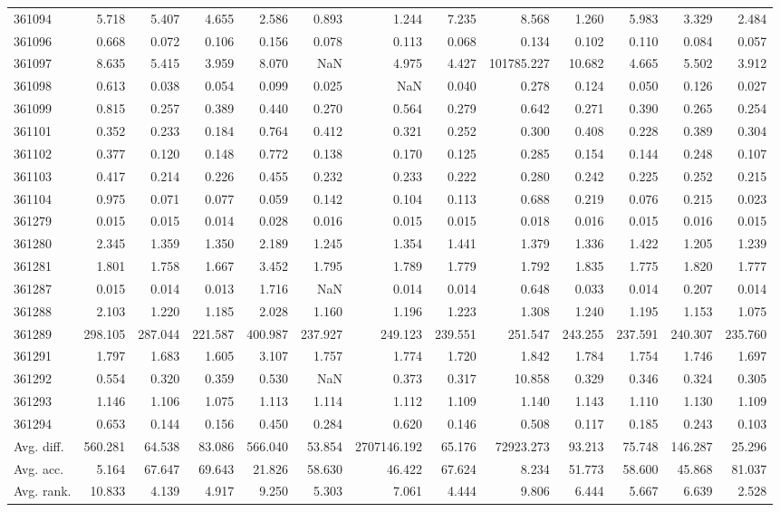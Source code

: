 \begin{tabular}{lrrrrrrrrrrrr}
361094 & 5.718 & 5.407 & 4.655 & 2.586 & 0.893 & 1.244 & 7.235 & 8.568 & 1.260 & 5.983 & 3.329 & 2.484 \\
361096 & 0.668 & 0.072 & 0.106 & 0.156 & 0.078 & 0.113 & 0.068 & 0.134 & 0.102 & 0.110 & 0.084 & 0.057 \\
361097 & 8.635 & 5.415 & 3.959 & 8.070 & NaN & 4.975 & 4.427 & 101785.227 & 10.682 & 4.665 & 5.502 & 3.912 \\
361098 & 0.613 & 0.038 & 0.054 & 0.099 & 0.025 & NaN & 0.040 & 0.278 & 0.124 & 0.050 & 0.126 & 0.027 \\
361099 & 0.815 & 0.257 & 0.389 & 0.440 & 0.270 & 0.564 & 0.279 & 0.642 & 0.271 & 0.390 & 0.265 & 0.254 \\
361101 & 0.352 & 0.233 & 0.184 & 0.764 & 0.412 & 0.321 & 0.252 & 0.300 & 0.408 & 0.228 & 0.389 & 0.304 \\
361102 & 0.377 & 0.120 & 0.148 & 0.772 & 0.138 & 0.170 & 0.125 & 0.285 & 0.154 & 0.144 & 0.248 & 0.107 \\
361103 & 0.417 & 0.214 & 0.226 & 0.455 & 0.232 & 0.233 & 0.222 & 0.280 & 0.242 & 0.225 & 0.252 & 0.215 \\
361104 & 0.975 & 0.071 & 0.077 & 0.059 & 0.142 & 0.104 & 0.113 & 0.688 & 0.219 & 0.076 & 0.215 & 0.023 \\
361279 & 0.015 & 0.015 & 0.014 & 0.028 & 0.016 & 0.015 & 0.015 & 0.018 & 0.016 & 0.015 & 0.016 & 0.015 \\
361280 & 2.345 & 1.359 & 1.350 & 2.189 & 1.245 & 1.354 & 1.441 & 1.379 & 1.336 & 1.422 & 1.205 & 1.239 \\
361281 & 1.801 & 1.758 & 1.667 & 3.452 & 1.795 & 1.789 & 1.779 & 1.792 & 1.835 & 1.775 & 1.820 & 1.777 \\
361287 & 0.015 & 0.014 & 0.013 & 1.716 & NaN & 0.014 & 0.014 & 0.648 & 0.033 & 0.014 & 0.207 & 0.014 \\
361288 & 2.103 & 1.220 & 1.185 & 2.028 & 1.160 & 1.196 & 1.223 & 1.308 & 1.240 & 1.195 & 1.153 & 1.075 \\
361289 & 298.105 & 287.044 & 221.587 & 400.987 & 237.927 & 249.123 & 239.551 & 251.547 & 243.255 & 237.591 & 240.307 & 235.760 \\
361291 & 1.797 & 1.683 & 1.605 & 3.107 & 1.757 & 1.774 & 1.720 & 1.842 & 1.784 & 1.754 & 1.746 & 1.697 \\
361292 & 0.554 & 0.320 & 0.359 & 0.530 & NaN & 0.373 & 0.317 & 10.858 & 0.329 & 0.346 & 0.324 & 0.305 \\
361293 & 1.146 & 1.106 & 1.075 & 1.113 & 1.114 & 1.112 & 1.109 & 1.140 & 1.143 & 1.110 & 1.130 & 1.109 \\
361294 & 0.653 & 0.144 & 0.156 & 0.450 & 0.284 & 0.620 & 0.146 & 0.508 & 0.117 & 0.185 & 0.243 & 0.103 \\
Avg. diff. & 560.281 & 64.538 & 83.086 & 566.040 & 53.854 & 2707146.192 & 65.176 & 72923.273 & 93.213 & 75.748 & 146.287 & 25.296 \\
Avg. acc. & 5.164 & 67.647 & 69.643 & 21.826 & 58.630 & 46.422 & 67.624 & 8.234 & 51.773 & 58.600 & 45.868 & 81.037 \\
Avg. rank. & 10.833 & 4.139 & 4.917 & 9.250 & 5.303 & 7.061 & 4.444 & 9.806 & 6.444 & 5.667 & 6.639 & 2.528 \\
\bottomrule
\end{tabular}
